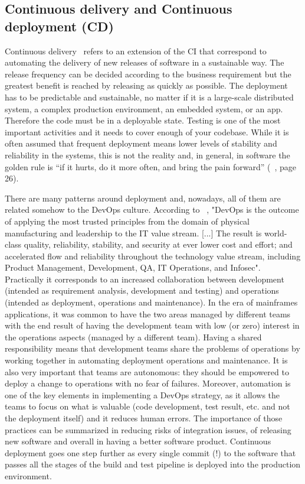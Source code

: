 \documentclass[a4paper]{spie}  %
\begin{document}
\subsection{Continuous delivery and Continuous deployment (CD)}
Continuous delivery~\cite{CD} refers to an extension of the CI that correspond to automating the delivery of new releases of software in a sustainable way. The release frequency can be decided according to the business requirement but the greatest benefit is reached by releasing as quickly as possible. 
The deployment has to be predictable and sustainable, no matter if it is a large-scale distributed system, a complex production environment, an embedded system, or an app. Therefore the code must be in a deployable state. Testing is one of the most important activities and it needs to cover enough of your codebase. 
While it is often assumed that frequent deployment means lower levels of stability and reliability in the systems, this is not the reality and, in general, in software the golden rule is “if it hurts, do it more often, and bring the pain forward” (~\cite{CD}, page 26).

There are many patterns around deployment and, nowadays, all of them are related somehow to the DevOps culture. According to ~\cite{DevOps}, "DevOps is the outcome of applying the most trusted principles from the domain of physical manufacturing and leadership to the IT value stream. [...] The result is world-class quality, reliability, stability, and security at ever lower cost and effort; and accelerated flow and reliability throughout the technology value stream, including Product Management, Development, QA, IT Operations, and Infosec". Practically it corresponds to an increased collaboration between development (intended as requirement analysis, development and testing) and operations (intended as deployment, operations and maintenance). In the era of mainframes applications, it was common to have the two areas managed by different teams with the end result of having the development team with low (or zero) interest in the operations aspects (managed by a different team). Having a shared responsibility means that development teams share the problems of operations by working together in automating deployment operations and maintenance. It is also very important that teams are autonomous: they should be empowered to deploy a change to operations with no fear of failures. 
Moreover, automation is one of the key elements in implementing a DevOps strategy, as it allows the teams to focus on what is valuable (code development, test result, etc. and not the deployment itself) and it reduces human errors.
The importance of those practices can be summarized in reducing risks of integration issues, of releasing new software and overall in having a better software product. 
Continuous deployment goes one step further as every single commit (!) to the software that passes all the stages of the build and test pipeline is deployed into the production environment. 
\end{document}
